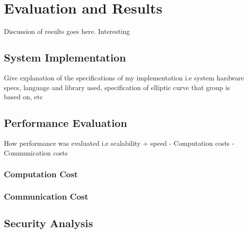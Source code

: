 \chapter{Evaluation and Results}
\label{chap:evaluation_and_results}

Discussion of results goes here. Interesting

\section{System Implementation}

Give explanation of the specifications of my implementation i.e system hardware specs, language and library used, specification of elliptic curve that group is based on, etc


\section{Performance Evaluation}

	How performance was evaluated i.e scalability + speed
- Computation costs
- Communication costs

\subsection*{Computation Cost}


\subsection*{Communication Cost}


\section{Security Analysis}